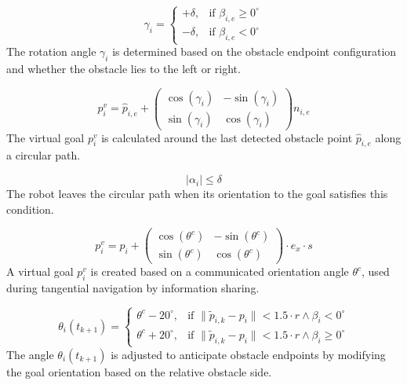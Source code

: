 \documentclass[conference]{IEEEtran}
\begin{document}
\begin{equation}
\gamma_i =
\begin{cases}
+\delta, & \text{if } \beta_{i,e} \geq 0^\circ \\
-\delta, & \text{if } \beta_{i,e} < 0^\circ
\end{cases}
\label{eq:34}
\end{equation}
The rotation angle $\gamma_i$ is determined based on the obstacle endpoint configuration and whether the obstacle lies to the left or right.

\begin{equation}
p^v_i = \hat{p}_{i,e} +
\begin{pmatrix}
\cos(\gamma_i) & -\sin(\gamma_i) \\
\sin(\gamma_i) & \cos(\gamma_i)
\end{pmatrix}
n_{i,e}
\label{eq:35}
\end{equation}
The virtual goal $p^v_i$ is calculated around the last detected obstacle point $\hat{p}_{i,e}$ along a circular path.

\begin{equation}
| \alpha_i | \leq \delta
\label{eq:36}
\end{equation}
The robot leaves the circular path when its orientation to the goal satisfies this condition.

\begin{equation}
p^v_i = p_i +
\begin{pmatrix}
\cos(\theta^c) & -\sin(\theta^c) \\
\sin(\theta^c) & \cos(\theta^c)
\end{pmatrix}
\cdot e_x \cdot s
\label{eq:37}
\end{equation}
A virtual goal $p^v_i$ is created based on a communicated orientation angle $\theta^c$, used during tangential navigation by information sharing.

\begin{equation}
\theta_i(t_{k+1}) =
\begin{cases}
\theta^c - 20^\circ, & \text{if } \| \tilde{p}_{i,k} - p_i \| < 1.5 \cdot r \wedge \beta_i < 0^\circ \\
\theta^c + 20^\circ, & \text{if } \| \tilde{p}_{i,k} - p_i \| < 1.5 \cdot r \wedge \beta_i \geq 0^\circ
\end{cases}
\label{eq:38}
\end{equation}
The angle $\theta_i(t_{k+1})$ is adjusted to anticipate obstacle endpoints by modifying the goal orientation based on the relative obstacle side.
\end{document}
